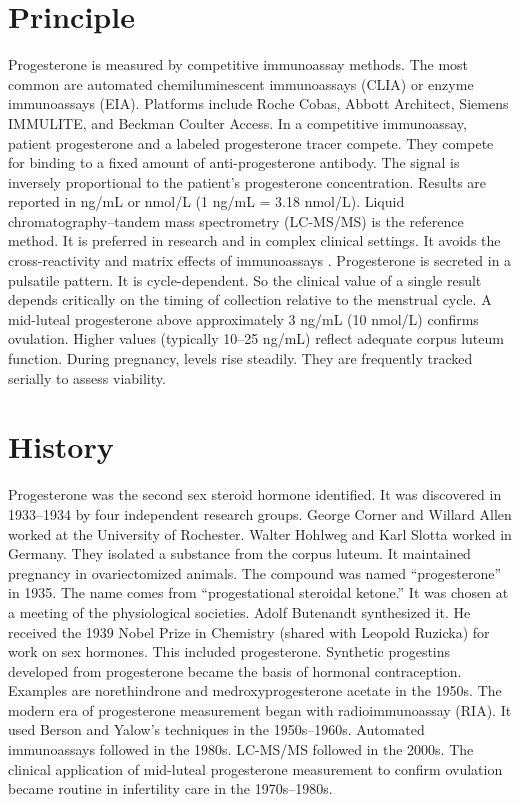 \section*{Principle}
Progesterone is measured by competitive immunoassay methods. The most common are automated chemiluminescent immunoassays (CLIA) or enzyme immunoassays (EIA). Platforms include Roche Cobas, Abbott Architect, Siemens IMMULITE, and Beckman Coulter Access. In a competitive immunoassay, patient progesterone and a labeled progesterone tracer compete. They compete for binding to a fixed amount of anti-progesterone antibody. The signal is inversely proportional to the patient's progesterone concentration. Results are reported in ng/mL or nmol/L (1 ng/mL = 3.18 nmol/L). Liquid chromatography--tandem mass spectrometry (LC-MS/MS) is the reference method. It is preferred in research and in complex clinical settings. It avoids the cross-reactivity and matrix effects of immunoassays \cite{tietz2012textbook}. Progesterone is secreted in a pulsatile pattern. It is cycle-dependent. So the clinical value of a single result depends critically on the timing of collection relative to the menstrual cycle. A mid-luteal progesterone above approximately 3 ng/mL (10 nmol/L) confirms ovulation. Higher values (typically 10--25 ng/mL) reflect adequate corpus luteum function. During pregnancy, levels rise steadily. They are frequently tracked serially to assess viability.

\section*{History}
Progesterone was the second sex steroid hormone identified. It was discovered in 1933--1934 by four independent research groups. George Corner and Willard Allen worked at the University of Rochester. Walter Hohlweg and Karl Slotta worked in Germany. They isolated a substance from the corpus luteum. It maintained pregnancy in ovariectomized animals. The compound was named ``progesterone'' in 1935. The name comes from ``progestational steroidal ketone.'' It was chosen at a meeting of the physiological societies. Adolf Butenandt synthesized it. He received the 1939 Nobel Prize in Chemistry (shared with Leopold Ruzicka) for work on sex hormones. This included progesterone. Synthetic progestins developed from progesterone became the basis of hormonal contraception. Examples are norethindrone and medroxyprogesterone acetate in the 1950s. The modern era of progesterone measurement began with radioimmunoassay (RIA). It used Berson and Yalow's techniques in the 1950s--1960s. Automated immunoassays followed in the 1980s. LC-MS/MS followed in the 2000s. The clinical application of mid-luteal progesterone measurement to confirm ovulation became routine in infertility care in the 1970s--1980s.


